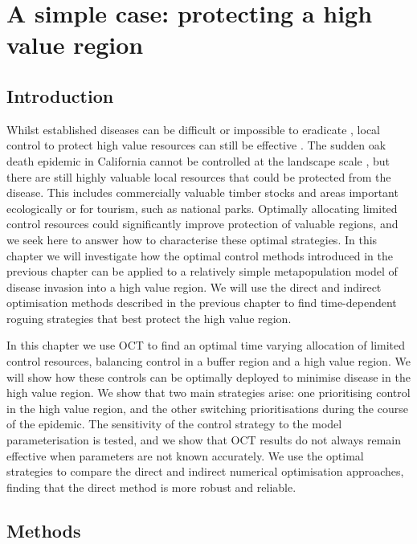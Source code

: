 %
\chapter{A simple case: protecting a high value region}\label{ch:three_patch}

\section{Introduction}\label{sec:ch3:intro}

Whilst established diseases can be difficult or impossible to eradicate \citep[e.g.][]{gottwald_post_2007}, local control to protect high value resources can still be effective \citep[e.g.][]{hansen_efficacy_2019}. The sudden oak death epidemic in California cannot be controlled at the landscape scale \citep{cunniffe_modelling_2016}, but there are still highly valuable local resources that could be protected from the disease. This includes commercially valuable timber stocks and areas important ecologically or for tourism, such as national parks. Optimally allocating limited control resources could significantly improve protection of valuable regions, and we seek here to answer how to characterise these optimal strategies. In this chapter we will investigate how the optimal control methods introduced in the previous chapter can be applied to a relatively simple metapopulation model of disease invasion into a high value region. We will use the direct and indirect optimisation methods described in the previous chapter to find time-dependent roguing strategies that best protect the high value region.

In this chapter we use OCT to find an optimal time varying allocation of limited control resources, balancing control in a buffer region and a high value region. We will show how these controls can be optimally deployed to minimise disease in the high value region. We show that two main strategies arise: one prioritising control in the high value region, and the other switching prioritisations during the course of the epidemic. The sensitivity of the control strategy to the model parameterisation is tested, and we show that OCT results do not always remain effective when parameters are not known accurately. We use the optimal strategies to compare the direct and indirect numerical optimisation approaches, finding that the direct method is more robust and reliable.

\section{Methods}

